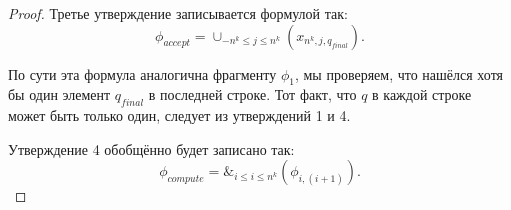 \begin{proof}
Третье утверждение записывается формулой так:
\[
	\phi_{accept} = \cup_{-n^k\le j\le n^k} (x_{n^k, j, q_{final}})
.\] 

По сути эта формула аналогична фрагменту $\phi_1$, мы проверяем, что нашёлся
хотя бы один элемент $q_{final}$ в последней строке. Тот факт, что $q$ в каждой
строке может быть только один, следует из утверждений 1 и 4.

Утверждение 4 обобщённо будет записано так:
 \[
	 \phi_{compute} =  \&_{i\le i\le n^k} (\phi_{i, (i+1)})
.\] 
\end{proof}


